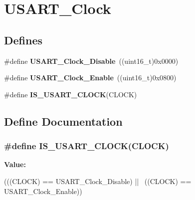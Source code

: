\hypertarget{group__USART__Clock}{
\section{USART\_\-Clock}
\label{group__USART__Clock}
}
\subsection*{Defines}
\begin{DoxyCompactItemize}
\item 
\hypertarget{group__USART__Clock_ga56c12b81d19853c093e0a373d0c52fb5}{
\#define {\bfseries USART\_\-Clock\_\-Disable}~((uint16\_\-t)0x0000)}
\label{group__USART__Clock_ga56c12b81d19853c093e0a373d0c52fb5}

\item 
\hypertarget{group__USART__Clock_gacfe029e2ec4f49ddde031fd031654caa}{
\#define {\bfseries USART\_\-Clock\_\-Enable}~((uint16\_\-t)0x0800)}
\label{group__USART__Clock_gacfe029e2ec4f49ddde031fd031654caa}

\item 
\#define {\bfseries IS\_\-USART\_\-CLOCK}(CLOCK)
\end{DoxyCompactItemize}


\subsection{Define Documentation}
\hypertarget{group__USART__Clock_ga0f1e1ba37690b21b7338ed3b06614cf6}{
\subsubsection[{IS\_\-USART\_\-CLOCK}]{\setlength{\rightskip}{0pt plus 5cm}\#define IS\_\-USART\_\-CLOCK(CLOCK)}}
\label{group__USART__Clock_ga0f1e1ba37690b21b7338ed3b06614cf6}
{\bfseries Value:}
\begin{DoxyCode}
(((CLOCK) == USART_Clock_Disable) || \
                               ((CLOCK) == USART_Clock_Enable))
\end{DoxyCode}
